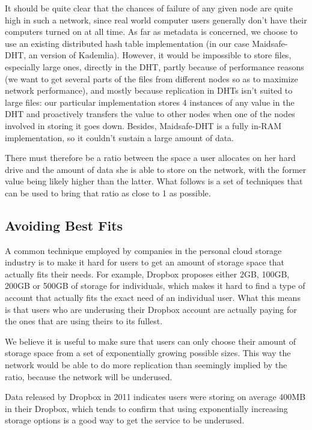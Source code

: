 \documentclass{acm_}
\begin{document}
It should be quite clear that the chances of failure of any given node are quite high in such a network, since real world computer users generally don't have their computers turned on at all time. As far as metadata is concerned, we choose to use an existing distributed hash table implementation (in our case Maidsafe-DHT, an version of Kademlia). However, it would be impossible to store files, especially large ones, directly in the DHT, partly because of performance reasons (we want to get several parts of the files from different nodes so as to maximize network performance), and mostly because replication in DHTs isn't suited to large files: our particular implementation stores 4 instances of any value in the DHT and proactively transfers the value to other nodes when one of the nodes involved in storing it goes down. Besides, Maidsafe-DHT is a fully in-RAM implementation, so it couldn't sustain a large amount of data.

There must therefore be a ratio between the space a user allocates on her hard drive and the amount of data she is able to store on the network, with the former value being likely higher than the latter. What follows is a set of techniques that can be used to bring that ratio as close to 1 as possible.

\subsection{Avoiding Best Fits}

A common technique employed by companies in the personal cloud storage industry is to make it hard for users to get an amount of storage space that actually fits their needs. For example, Dropbox proposes either 2GB, 100GB, 200GB or 500GB of storage for individuals\cite{dropbox}, which makes it hard to find a type of account that actually fits the exact need of an individual user. What this means is that users who are underusing their Dropbox account are actually paying for the ones that are using theirs to its fullest.

We believe it is useful to make sure that users can only choose their amount of storage space from a set of exponentially growing possible sizes. This way the network would be able to do more replication than seemingly implied by the ratio, because the network will be underused.

Data released by Dropbox in 2011 indicates users were storing on average 400MB in their Dropbox\cite{dropbox_slides}, which tends to confirm that using exponentially increasing storage options is a good way to get the service to be underused.
\end{document}
